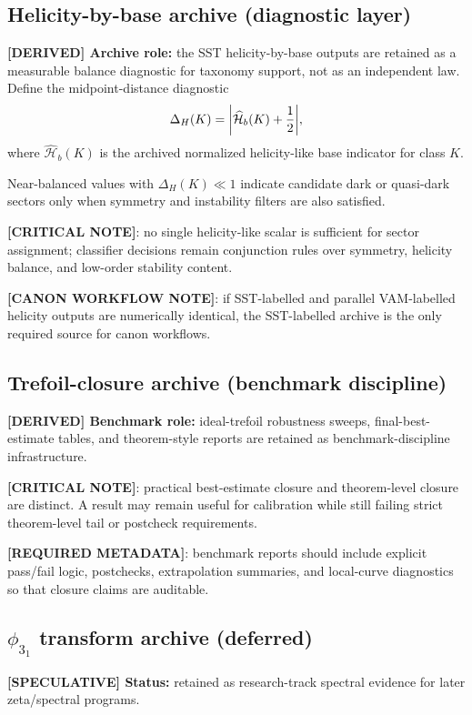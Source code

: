 \subsection{Helicity-by-base archive (diagnostic layer)}
\textbf{[DERIVED] Archive role:} the SST helicity-by-base outputs are retained as a measurable balance diagnostic for taxonomy support, not as an independent law.
Define the midpoint-distance diagnostic
\begin{align}
    \Delta_H(K)=\abs{\widehat{\mathcal{H}}_{b}(K)+\frac{1}{2}},
\end{align}
where $\widehat{\mathcal{H}}_{b}(K)$ is the archived normalized helicity-like base indicator for class $K$.

Near-balanced values with $\Delta_H(K)\ll 1$ indicate candidate dark or quasi-dark sectors only when symmetry and instability filters are also satisfied.

\textbf{[CRITICAL NOTE]}: no single helicity-like scalar is sufficient for sector assignment; classifier decisions remain conjunction rules over symmetry, helicity balance, and low-order stability content.

\textbf{[CANON WORKFLOW NOTE]}: if SST-labelled and parallel VAM-labelled helicity outputs are numerically identical, the SST-labelled archive is the only required source for canon workflows.

\subsection{Trefoil-closure archive (benchmark discipline)}
\textbf{[DERIVED] Benchmark role:} ideal-trefoil robustness sweeps, final-best-estimate tables, and theorem-style reports are retained as benchmark-discipline infrastructure.

\textbf{[CRITICAL NOTE]}: practical best-estimate closure and theorem-level closure are distinct.
A result may remain useful for calibration while still failing strict theorem-level tail or postcheck requirements.

\textbf{[REQUIRED METADATA]}: benchmark reports should include explicit pass/fail logic, postchecks, extrapolation summaries, and local-curve diagnostics so that closure claims are auditable.

\subsection{\texorpdfstring{$\phi_{3_1}$}{phi3_1} transform archive (deferred)}
\textbf{[SPECULATIVE] Status:} retained as research-track spectral evidence for later zeta/spectral programs.

